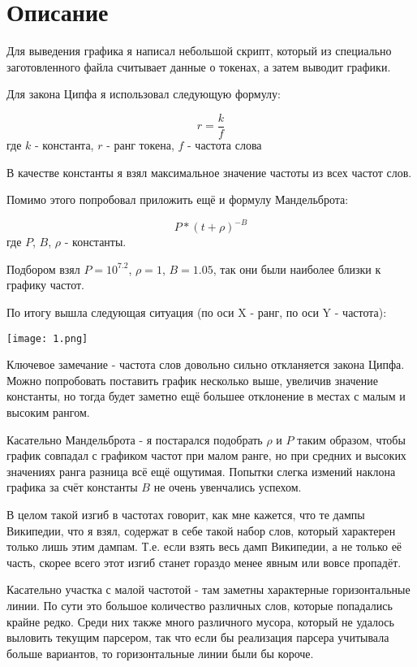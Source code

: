 \section{Описание}

Для выведения графика я написал небольшой скрипт, который из специально заготовленного файла считывает данные о токенах, а затем выводит графики.

Для закона Ципфа я использовал следующую формулу:

$$ r = \frac{k}{f} $$
где $k$ - константа, $r$ - ранг токена, $f$ - частота слова

В качестве константы я взял максимальное значение частоты из всех частот слов.

Помимо этого попробовал приложить ещё и формулу Мандельброта:

$$ P * (t + \rho)^{-B} $$ 
где $P$, $B$, $\rho$ - константы.

Подбором взял $P = 10^{7.2}$, $\rho = 1$, $B = 1.05$, так они были наиболее близки к графику частот.

\pagebreak
По итогу вышла следующая ситуация (по оси X - ранг, по оси Y - частота):

\texttt{[image: 1.png]}

Ключевое замечание - частота слов довольно сильно откланяется закона Ципфа. Можно попробовать поставить график несколько выше, увеличив значение константы, но тогда будет заметно ещё большее отклонение в местах с малым и высоким рангом.

Касательно Мандельброта - я постарался подобрать $\rho$ и $P$ таким образом, чтобы график совпадал с графиком частот при малом ранге, но при средних и высоких значениях ранга разница всё ещё ощутимая. Попытки слегка измений наклона графика за счёт константы $B$ не очень увенчались успехом.

В целом такой изгиб в частотах говорит, как мне кажется, что те дампы Википедии, что я взял, содержат в себе такой набор слов, который характерен только лишь этим дампам. Т.е. если взять весь дамп Википедии, а не только её часть, скорее всего этот изгиб станет гораздо менее явным или вовсе пропадёт.

Касательно участка с малой частотой - там заметны характерные горизонтальные линии. По сути это большое количество различных слов, которые попадались крайне редко. Среди них также много различного мусора, который не удалось выловить текущим парсером, так что если бы реализация парсера учитывала больше вариантов, то горизонтальные линии были бы короче.

